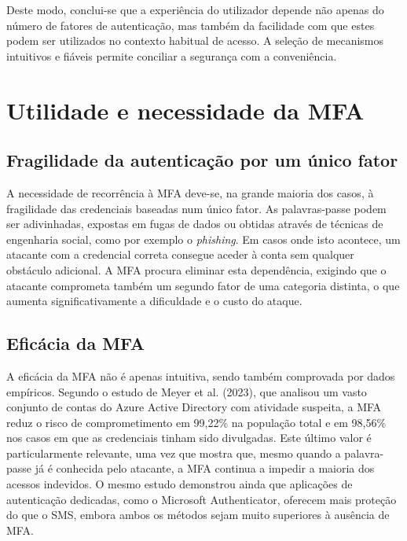 \hspace{1cm} Deste modo, conclui-se que a experiência do utilizador depende não apenas do número de fatores de autenticação, mas também da facilidade com que estes podem ser utilizados no contexto habitual de acesso. A seleção de mecanismos intuitivos e fiáveis permite conciliar a segurança com a conveniência.


\section{Utilidade e necessidade da MFA}

\subsection{Fragilidade da autenticação por um único fator}

\hspace{1cm} A necessidade de recorrência à MFA deve-se, na grande maioria dos casos, à fragilidade das credenciais baseadas num único fator. As palavras-passe podem ser adivinhadas, expostas em fugas de dados ou obtidas através de técnicas de engenharia social, como por exemplo o \textit{phishing}. Em casos onde isto acontece, um atacante com a credencial correta consegue aceder à conta sem qualquer obstáculo adicional. A MFA procura eliminar esta dependência, exigindo que o atacante comprometa também um segundo fator de uma categoria distinta, o que aumenta significativamente a dificuldade e o custo do ataque.

\subsection{Eficácia da MFA}

\hspace{1cm} A eficácia da MFA não é apenas intuitiva, sendo também comprovada por dados empíricos. Segundo o estudo de Meyer et al. (2023), que analisou um vasto conjunto de contas do Azure Active Directory com atividade suspeita, a MFA reduz o risco de comprometimento em 99,22\% na população total e em 98,56\% nos casos em que as credenciais tinham sido divulgadas. Este último valor é particularmente relevante, uma vez que mostra que, mesmo quando a palavra-passe já é conhecida pelo atacante, a MFA continua a impedir a maioria dos acessos indevidos. O mesmo estudo demonstrou ainda que aplicações de autenticação dedicadas, como o Microsoft Authenticator, oferecem mais proteção do que o SMS, embora ambos os métodos sejam muito superiores à ausência de MFA.


